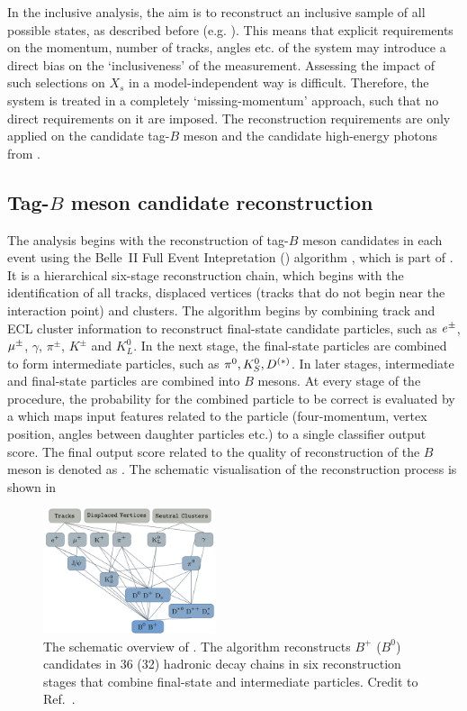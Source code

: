 
In the inclusive \BtoXsgamma analysis, the aim is to reconstruct an inclusive sample of all possible \Xs states, 
as described before (e.g. ).
This means that explicit requirements on the momentum, number of tracks, angles etc. of the \Xs system may introduce a direct bias on the `inclusiveness' of the measurement.
Assessing the impact of such selections on $X_s$ in a model-independent way is difficult.
Therefore, the \Xs system is treated in a completely `missing-momentum' approach, such that no direct requirements on it are imposed.
The reconstruction requirements are only applied on the candidate tag-$B$ meson and the candidate high-energy photons from \BtoXsgamma.
\subsection{Tag-\texorpdfstring{$B$}{B} meson candidate reconstruction}\label{sec:tag_reconstruction}

The analysis begins with the reconstruction of tag-$B$ meson candidates in each event
using the Belle~II Full Event Intepretation (\FEI) algorithm \cite{Keck:2017mui,Keck:2018lcd}, which is part of \basftwo.
It is a hierarchical six-stage reconstruction chain, which begins with the identification of all tracks, displaced vertices (tracks that do not begin near the interaction point) and \ECL clusters.
The algorithm begins by combining track and ECL cluster information to reconstruct final-state candidate particles,
such as $e^\pm$, $\mu^{\pm}$, $\gamma$,  $\pi^{\pm}$, $K^{\pm}$ and $K_L^0$.
In the next stage, the final-state particles are combined to form intermediate particles, such as $\pi^0, K_S^0, D^{(*)}$.
In later stages, intermediate and final-state particles are combined into $B$ mesons.
At every stage of the procedure, the probability for the combined particle to be correct is evaluated by a \BDT
which maps input features related to the particle (four-momentum, vertex position, angles between daughter particles etc.) to a single classifier
output score. The final output score related to the quality of reconstruction of the $B$ meson is denoted as \feiProb. 
The schematic visualisation of the reconstruction process is shown in 
\begin{figure}[htbp!]
    \centering
    \includegraphics[width=0.45\textwidth]{figures/event_reconstruction/FEI_tagging.png}
    \caption{\label{fig:fei_schematic} 
    The schematic overview of \FEI.
    The algorithm reconstructs $B^+$ ($B^0$) candidates in 36 (32) hadronic decay chains
    in six reconstruction stages that combine final-state and intermediate particles.
    Credit to Ref.~\cite{Keck:2018lcd}.
    }
\end{figure}

